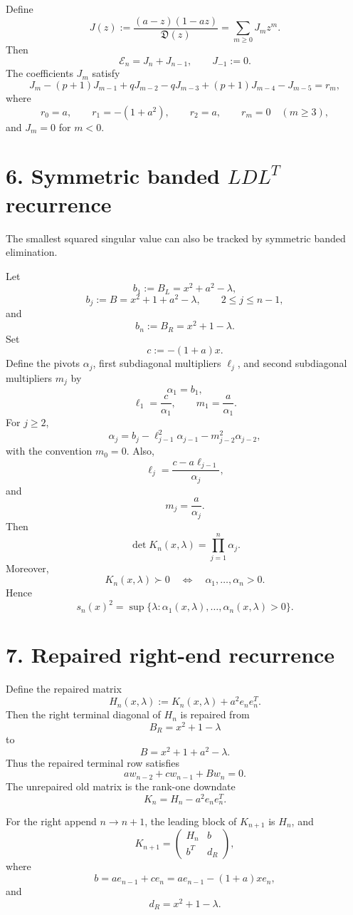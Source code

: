 \documentclass[11pt]{article}
\begin{document}
Define
\[
J(z):=
\frac{(a-z)(1-az)}{\mathfrak D(z)}
=
\sum_{m\ge0}J_mz^m.
\]
Then
\[
\boxed{
\mathcal E_n=J_n+J_{n-1},
\qquad J_{-1}:=0.
}
\tag{23}
\]
The coefficients \(J_m\) satisfy
\[
\boxed{
J_m
-(p+1)J_{m-1}
+qJ_{m-2}
-qJ_{m-3}
+(p+1)J_{m-4}
-J_{m-5}
=r_m,
}
\tag{24}
\]
where
\[
r_0=a,\qquad
r_1=-(1+a^2),\qquad
r_2=a,\qquad
r_m=0\quad(m\ge3),
\]
and \(J_m=0\) for \(m<0\).

\section*{6. Symmetric banded \(LDL^T\) recurrence}

The smallest squared singular value can also be tracked by symmetric banded elimination.

Let
\[
b_1:=B_L=x^2+a^2-\lambda,
\]
\[
b_j:=B=x^2+1+a^2-\lambda,
\qquad 2\le j\le n-1,
\]
and
\[
b_n:=B_R=x^2+1-\lambda.
\]
Set
\[
c:=-(1+a)x.
\]
Define the pivots \(\alpha_j\), first subdiagonal multipliers \(\ell_j\), and second subdiagonal multipliers \(m_j\) by
\[
\boxed{
\alpha_1=b_1,
}
\tag{25}
\]
\[
\boxed{
\ell_1=\frac{c}{\alpha_1},
\qquad
m_1=\frac{a}{\alpha_1}.
}
\tag{26}
\]
For \(j\ge2\),
\[
\boxed{
\alpha_j
=
b_j-\ell_{j-1}^2\alpha_{j-1}-m_{j-2}^2\alpha_{j-2},
}
\tag{27}
\]
with the convention \(m_0=0\). Also,
\[
\boxed{
\ell_j
=
\frac{c-a\ell_{j-1}}{\alpha_j},
}
\tag{28}
\]
and
\[
\boxed{
m_j=\frac{a}{\alpha_j}.
}
\tag{29}
\]
Then
\[
\boxed{
\det K_n(x,\lambda)=\prod_{j=1}^n\alpha_j.
}
\tag{30}
\]
Moreover,
\[
\boxed{
K_n(x,\lambda)\succ0
\quad\Longleftrightarrow\quad
\alpha_1,\dots,\alpha_n>0.
}
\tag{31}
\]
Hence
\[
\boxed{
s_n(x)^2
=
\sup\{\lambda:\alpha_1(x,\lambda),\dots,\alpha_n(x,\lambda)>0\}.
}
\tag{32}
\]

\section*{7. Repaired right-end recurrence}

Define the repaired matrix
\[
H_n(x,\lambda):=K_n(x,\lambda)+a^2e_ne_n^T.
\]
Then the right terminal diagonal of \(H_n\) is repaired from
\[
B_R=x^2+1-\lambda
\]
to
\[
B=x^2+1+a^2-\lambda.
\]
Thus the repaired terminal row satisfies
\[
\boxed{
aw_{n-2}+cw_{n-1}+Bw_n=0.
}
\tag{33}
\]
The unrepaired old matrix is the rank-one downdate
\[
\boxed{
K_n=H_n-a^2e_ne_n^T.
}
\tag{34}
\]

For the right append \(n\to n+1\), the leading block of \(K_{n+1}\) is \(H_n\), and
\[
\boxed{
K_{n+1}
=
\begin{pmatrix}
H_n & b\\
b^T & d_R
\end{pmatrix},
}
\tag{35}
\]
where
\[
\boxed{
b=a e_{n-1}+c e_n
=
a e_{n-1}-(1+a)x e_n,
}
\tag{36}
\]
and
\[
\boxed{
d_R=x^2+1-\lambda.
}
\tag{37}
\]
\end{document}
